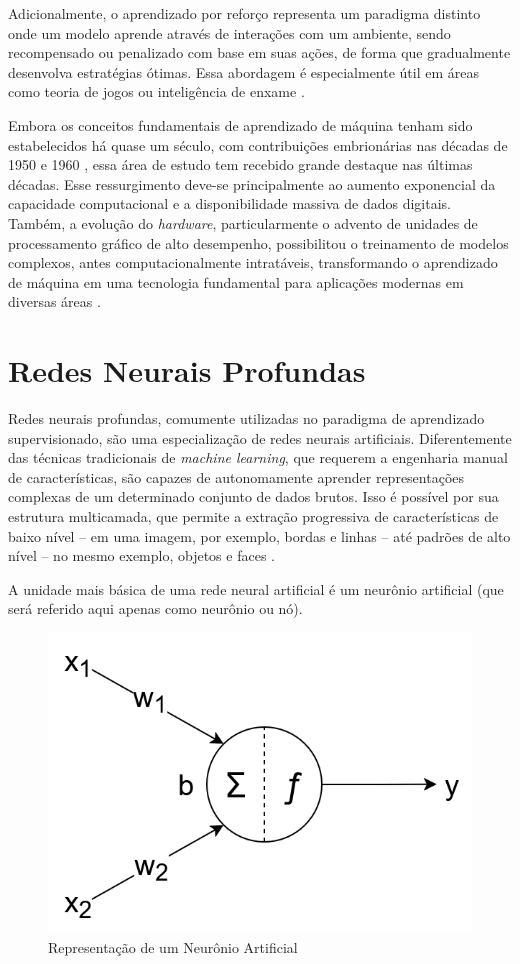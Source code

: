 Adicionalmente, o aprendizado por reforço representa um paradigma distinto onde um modelo aprende através de interações com um ambiente, sendo recompensado ou penalizado com base em suas ações, de forma que gradualmente desenvolva estratégias ótimas. Essa abordagem é especialmente útil em áreas como teoria de jogos ou inteligência de enxame \cite{mlSarker}.

Embora os conceitos fundamentais de aprendizado de máquina tenham sido estabelecidos há quase um século, com contribuições embrionárias nas décadas de 1950 e 1960 \cite{mlDietterich}, essa área de estudo tem recebido grande destaque nas últimas décadas. Esse ressurgimento deve-se principalmente ao aumento exponencial da capacidade computacional e a disponibilidade massiva de dados digitais. Também, a evolução do \textit{hardware}, particularmente o advento de unidades de processamento gráfico de alto desempenho, possibilitou o treinamento de modelos complexos, antes computacionalmente intratáveis, transformando o aprendizado de máquina em uma tecnologia fundamental para aplicações modernas em diversas áreas \cite{mlSarker}.

\section{Redes Neurais Profundas}

Redes neurais profundas, comumente utilizadas no paradigma de aprendizado supervisionado, são uma especialização de redes neurais artificiais. Diferentemente das técnicas tradicionais de \textit{machine learning}, que requerem a engenharia manual de características, são capazes de autonomamente aprender representações complexas de um determinado conjunto de dados brutos. Isso é possível por sua estrutura multicamada, que permite a extração progressiva de características de baixo nível -- em uma imagem, por exemplo, bordas e linhas -- até padrões de alto nível -- no mesmo exemplo, objetos e faces \cite{efficientdeep}.

A unidade mais básica de uma rede neural artificial é um neurônio artificial (que será referido aqui apenas como neurônio ou nó).

\begin{figure}[H]
	\caption{\label{fig:neuron}Representação de um Neurônio Artificial}
    \begin{center}
    \includegraphics[width=0.7\linewidth]{images/neuron.png}
	\end{center}
\end{figure}

